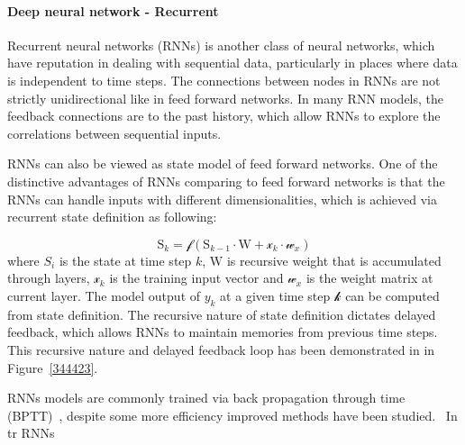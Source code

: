 \paragraph{Deep neural network - Recurrent}
Recurrent neural networks (RNNs) is another class of neural networks, which have reputation in dealing with sequential data, particularly in places where data is independent to time steps. The connections between nodes in RNNs are not strictly unidirectional like in feed forward networks. In many RNN models, the feedback connections are to the past history, which allow RNNs to explore the correlations between sequential inputs.   
\par 
RNNs can also be viewed as state model of feed forward networks. One of the distinctive advantages of RNNs comparing to feed forward networks is that the RNNs can handle inputs with different dimensionalities, which is achieved via recurrent state definition as following:

\begin{equation}
    \mathrm{S}_k = \mathcal{f}(\mathrm{S}_{k-1} \cdot \mathrm{W} + \mathcal{x}_k \cdot \mathcal{w}_x)
\end{equation}
where $S_i$ is the state at time step $k$, $\mathrm{W}$ is recursive weight that is accumulated through layers, $\mathcal{x}_k$ is the training input vector and $\mathcal{w}_x$ is the weight matrix at current layer. The model output of $y_k$ at a given time step $\mathcal{k}$ can be computed from state definition. The recursive nature of state definition dictates delayed feedback, which allows RNNs to maintain memories from previous time steps. This recursive nature and delayed feedback loop has been demonstrated in in Figure~\ref{344423}. 
\par 
RNNs models are commonly trained via back propagation through time (BPTT)~\cite{Goodfellow-et-al-2016}, despite some more efficiency improved methods have been studied.~\cite{963769,neco.1989,Gomez:2008:ANE:1390681.1390712} In tr RNNs 